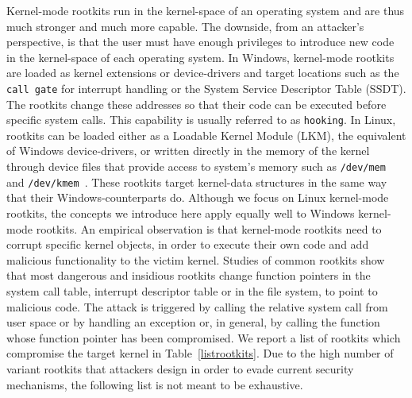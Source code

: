 Kernel-mode rootkits run in the kernel-space of an operating system and are thus much stronger and much more capable. The downside, from an attacker's perspective, is that the user must have enough privileges to introduce new code in the kernel-space of each operating system. In Windows, kernel-mode rootkits are loaded as kernel extensions or device-drivers and target locations such as the \texttt{call gate} for interrupt handling or the System Service Descriptor Table (SSDT).
The rootkits change these addresses so that their code can be executed before specific system calls. This capability is usually referred to as \texttt{hooking}. In Linux, rootkits can be loaded either as a Loadable Kernel Module (LKM), the equivalent of Windows device-drivers, or written directly in the memory of the kernel through device files that provide access to system's memory such as \texttt{/dev/mem} and \texttt{/dev/kmem}~\cite{kmemRootkit}. These rootkits target kernel-data structures in the same way that their Windows-counterparts do. Although we focus on Linux kernel-mode rootkits, the concepts we introduce here apply equally well to Windows kernel-mode rootkits.
An empirical observation is that kernel-mode rootkits need to corrupt specific kernel objects, in order to execute their own code and add malicious functionality to the victim kernel.
Studies of common rootkits \cite{packetstorm,4} show that most dangerous and insidious rootkits change function pointers in the system call table, interrupt descriptor table or in the file system, to point to malicious code. The attack is triggered by calling the relative system call from user space or by handling an exception or, in general, by calling the function whose function pointer has been compromised.
We report a list of rootkits which compromise the target kernel in Table~\ref{listrootkits}. 
Due to the high number of variant rootkits that attackers design in order to evade current security mechanisms, the following list is not meant to be exhaustive.

\setlength{\textfloatsep}{0.5mm}
\begin{table}%
\begin{center}
\end{center}
\vspace{-0.3cm}
\caption{Hooking methods of common Linux rootkits}
\vspace{0.3cm}
\label{listrootkits}
\end{table}



